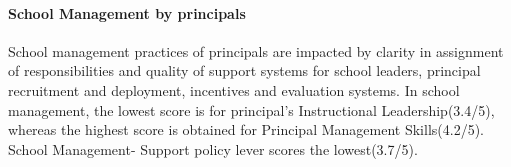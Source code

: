 \documentclass[twocolumn]{article}
\let\oldparagraph\paragraph
\renewcommand{\paragraph}[1]{\oldparagraph{#1}\mbox{}}
\begin{document}
\hypertarget{school-management-by-principals}{%
\paragraph{\texorpdfstring{\textbf{School Management by
principals}}{School Management by principals}}\label{school-management-by-principals}}

School management practices of principals are impacted by clarity in
assignment of responsibilities and quality of support systems for school
leaders, principal recruitment and deployment, incentives and evaluation
systems. In school management, the lowest score is for principal's
Instructional Leadership(3.4/5), whereas the highest score is obtained
for Principal Management Skills(4.2/5). School Management- Support
policy lever scores the lowest(3.7/5).
\end{document}
